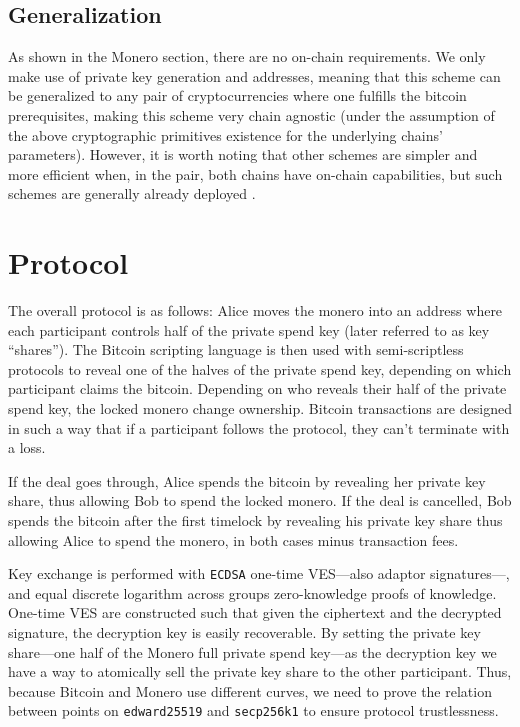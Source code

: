 \documentclass{llncs}
\begin{document}
\subsection{Generalization}
As shown in the Monero section, there are no on-chain requirements. We only make use of private key generation and addresses, meaning that this scheme can be generalized to any pair of cryptocurrencies where one fulfills the bitcoin prerequisites, making this scheme very chain agnostic (under the assumption of the above cryptographic primitives existence for the underlying chains' parameters). However, it is worth noting that other schemes are simpler and more efficient when, in the pair, both
chains have on-chain capabilities, but such schemes are generally already deployed \cite{atomic-swap, scriptless-atomic-swap, btcGrinSwap}.

\section{Protocol}
The overall protocol is as follows: Alice moves the monero into an address where each participant controls half of the private spend key (later referred to as key ``shares''). The Bitcoin scripting language is then used with semi-scriptless protocols to reveal one of the halves of the private spend key, depending on which participant claims the bitcoin. Depending on who reveals their half of the private spend key, the locked monero change ownership. Bitcoin transactions are designed in such a way
that if a participant follows the protocol, they can't terminate with a loss.

If the deal goes through, Alice spends the bitcoin by revealing her private key share, thus allowing Bob to spend the locked monero. If the deal is cancelled, Bob spends the bitcoin after the first timelock by revealing his private key share thus allowing Alice to spend the monero, in both cases minus transaction fees.

Key exchange is performed with \texttt{ECDSA} one-time VES---also adaptor signatures---, and equal discrete logarithm across groups zero-knowledge proofs of knowledge. One-time VES are constructed such that given the ciphertext and the decrypted signature, the decryption key is easily recoverable.
By setting the private key share---one half of the Monero full private spend key---as the decryption key we have a way to atomically sell the private key share to the other participant. Thus, because Bitcoin and Monero use different curves, we need to prove the relation between points on \texttt{edward25519} and \texttt{secp256k1} to ensure protocol trustlessness.
\end{document}
